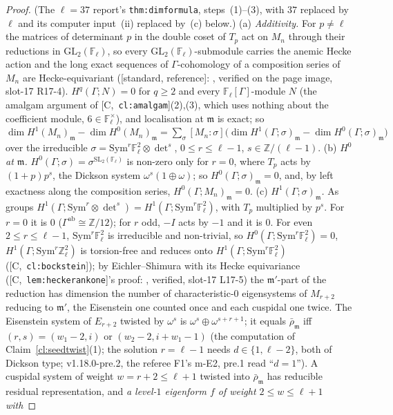 \documentclass[11pt]{article}
\theoremstyle{remark}
\newcommand{\F}{\mathbb{F}}
\newcommand{\Z}{\mathbb{Z}}
\newcommand{\GL}{\mathrm{GL}}
\newcommand{\SL}{\mathrm{SL}}
\newcommand{\Sym}{\mathrm{Sym}}
\newcommand{\Ga}{\Gamma}
\newcommand{\Fl}{\F_\ell}
\newcommand{\m}{\mathfrak{m}}
\newcommand{\Mn}{M_n}
\newcommand{\HA}[1]{[C,~\texttt{#1}]}      %
\newcommand{\STD}{\textsf{[standard, reference]}}
\begin{document}
\begin{proof}
(The $\ell=37$ report's \texttt{thm:dimformula}, steps~(1)--(3), with $37$ replaced by $\ell$ and its computer input~(ii) replaced by~(c) below.)
(a) \emph{Additivity.} For $p\ne\ell$ the matrices of determinant $p$ in the double coset of $T_p$ act on $\Mn$ through their reductions in $\GL_2(\Fl)$, so every
$\GL_2(\Fl)$-submodule carries the anemic Hecke action and the long exact sequences of $\Ga$-cohomology of a composition series of $\Mn$ are Hecke-equivariant
(\STD: \cite[Lemma~1.1.1, p.~194]{ash_stevens}, verified on the page image, slot-17 R17-4). $H^{q}(\Ga;N)=0$ for $q\ge2$ and every $\Fl[\Ga]$-module $N$ (the
amalgam argument of \HA{cl:amalgam}(2),(3), which uses nothing about the coefficient module, $6\in\Fl^{\times}$), and localisation at $\m$ is exact; so
$\dim H^1(\Mn)_\m-\dim H^0(\Mn)_\m=\sum_\sigma[\Mn:\sigma]\bigl(\dim H^1(\Ga;\sigma)_\m-\dim H^0(\Ga;\sigma)_\m\bigr)$ over the irreducible
$\sigma=\Sym^{r}\Fl^{2}\otimes{\det}^{s}$, $0\le r\le\ell-1$, $s\in\Z/(\ell-1)$.
(b) \emph{$H^0$ at $\m$.} $H^0(\Ga;\sigma)=\sigma^{\SL_2(\Fl)}$ is non-zero only for $r=0$, where $T_p$ acts by $(1+p)p^{s}$, the Dickson system
$\omega^{s}(1\oplus\omega)$; so $H^0(\Ga;\sigma)_\m=0$, and, by left exactness along the composition series, $H^0(\Ga;\Mn)_\m=0$.
(c) \emph{$H^1(\Ga;\sigma)_\m$.} As groups $H^1(\Ga;\Sym^{r}\otimes{\det}^{s})=H^1(\Ga;\Sym^{r}\Fl^{2})$, with $T_p$ multiplied by $p^{s}$. For $r=0$ it is $0$
($\Ga^{\mathrm{ab}}\cong\Z/12$); for $r$ odd, $-I$ acts by $-1$ and it is $0$. For even $2\le r\le\ell-1$, $\Sym^{r}\Fl^{2}$ is irreducible and non-trivial, so
$H^0(\Ga;\Sym^{r}\Fl^{2})=0$, $H^1(\Ga;\Sym^{r}\Z_\ell^{2})$ is torsion-free and reduces onto $H^1(\Ga;\Sym^{r}\Fl^{2})$ (\HA{cl:bockstein}); by
Eichler--Shimura with its Hecke equivariance (\HA{lem:heckerankone}'s proof: \cite[Thm.~12.2.2, p.~108; Prop.~12.4.10, p.~117]{diamond_im}, verified, slot-17 L17-5)
the $\m'$-part of the reduction has dimension the number of characteristic-$0$ eigensystems of $M_{r+2}$ reducing to $\m'$, the Eisenstein one counted once and
each cuspidal one twice. The Eisenstein system of $E_{r+2}$ twisted by $\omega^{s}$ is $\omega^{s}\oplus\omega^{s+r+1}$; it equals $\bar\rho_\m$ iff
$(r,s)=(w_1-2,i)$ or $(w_2-2,i+w_1-1)$ (the computation of Claim~\ref{cl:seedtwist}(1); the solution $r=\ell-1$ needs $d\in\{1,\ell-2\}$, both of Dickson type; v1.18.0-pre.2, the referee F1's m-E2,
pre.1 read ``$d=1$''). A cuspidal system of
weight $w=r+2\le\ell+1$ twisted into $\bar\rho_\m$ has reducible residual representation, and \emph{a level-$1$ eigenform $f$ of weight $2\le w\le\ell+1$ with
}
\end{proof}
\end{document}
